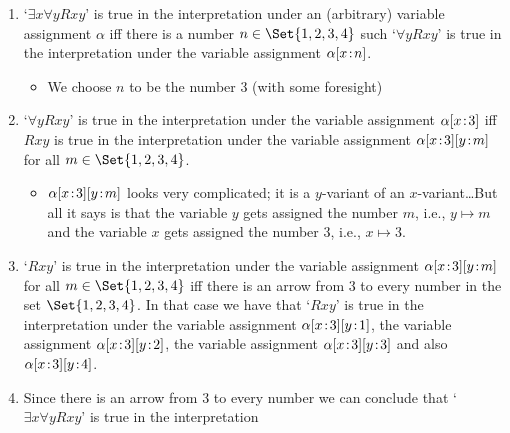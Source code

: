  \begin{enumerate}
 \item  `$\exists x\forall y Rxy$' is true in the interpretation under an (arbitrary) variable assignment $\alpha$ iff there is a number $n\in\Set{1,2,3,4}$ such `$\forall y Rxy$' is true in the interpretation under the variable assignment $\alpha[x \!:\! n]$. 
 \begin{itemize}
 \item We choose $n$ to be the number 3 (with some foresight)
 \end{itemize}
 \item `$\forall y Rxy$' is true in the interpretation under the variable assignment $\alpha[x \!:\! 3]$ iff $Rxy$ is true in the interpretation under the variable assignment $\alpha[x \!:\! 3][y \!:\! m]$ for all $m\in\Set{1,2,3,4}$.
 \begin{itemize}
 \item $\alpha[x \!:\! 3][y \!:\! m]$ looks very complicated; it is a $y$-variant of an $x$-variant\ldots But all it says is that the variable $y$ gets assigned the number $m$, i.e., $y\mapsto m$ and the variable $x$ gets assigned the number $3$, i.e., $x\mapsto 3$.
 \end{itemize}
 \item `$Rxy$' is true in the interpretation under the variable assignment $\alpha[x \!:\! 3][y \!:\! m]$ for all $m\in\Set{1,2,3,4}$ iff there is an arrow from $3$ to every number in the set $\Set{1,2,3,4}$. In that case we have that `$Rxy$' is true in the interpretation under the variable assignment $\alpha[x \!:\! 3][y \!:\! 1]$, the variable assignment $\alpha[x \!:\! 3][y \!:\! 2]$, the variable assignment $\alpha[x \!:\! 3][y \!:\! 3]$ and also $\alpha[x \!:\! 3][y \!:\! 4]$.
 \item Since there is an arrow from 3 to every number we can conclude that `$\exists x\forall y Rxy$' is true in the interpretation
 \end{enumerate}
 
